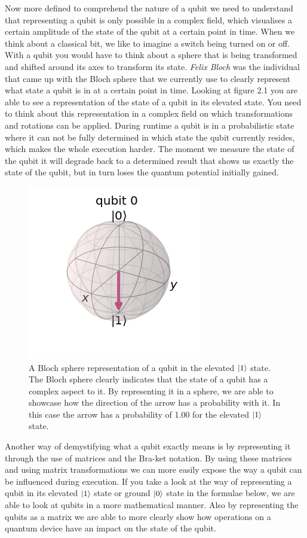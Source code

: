 Now more defined to comprehend the nature of a qubit we need to understand that representing a qubit is only possible in a complex field, which visualises a certain amplitude of the state of the qubit at a certain point in time. When we think about a classical bit, we like to imagine a switch being turned on or off. With a qubit you would have to think about a sphere that is being transformed and shifted around its axes to transform its state. \textit{Felix Bloch} was the individual that came up with the Bloch sphere that we currently use to clearly represent what state a qubit is in at a certain point in time. Looking at figure 2.1 you are able to see a representation of the state of a qubit in its elevated state. You need to think about this representation in a complex field on which transformations and rotations can be applied.
During runtime a qubit is in a probabilistic state where it can not be fully determined in which state the qubit currently resides, which makes the whole execution harder. The moment we measure the state of the qubit it will degrade back to a determined result that shows us exactly the state of the qubit, but in turn loses the quantum potential initially gained.

\begin{figure}[h]
	\centering
	\includegraphics[scale = 0.75]{../Demonstration/img/Quantum_essentials_1.PNG}
	\caption{A Bloch sphere representation of a qubit in the elevated $\ket{1}$ state. 
		The Bloch sphere clearly indicates that the state of a qubit has a complex aspect to it. By representing it in a sphere, we are able to showcase how the direction of the arrow has a probability with it. In this case the arrow has a probability of 1.00 for the elevated $\ket{1}$ state.}
\end{figure}

Another way of demystifying what a qubit exactly means is by representing it through the use of matrices and the Bra-ket notation. By using these matrices and using matrix transformations we can more easily expose the way a qubit can be influenced during execution. 
If you take a look at the way of representing a qubit in its elevated $\ket{1}$ state or ground $\ket{0}$ state in the formulae below, we are able to look at qubits in a more mathematical manner. Also by representing the qubits as a matrix we are able to more clearly show how operations on a quantum device have an impact on the state of the qubit.


